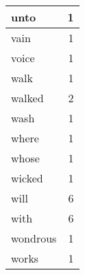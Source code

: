 \begin{center}
\begin{longtable}{l|r}
unto & 1 \\ \hline
vain & 1 \\ \hline
voice & 1 \\ \hline
walk & 1 \\ \hline
walked & 2 \\ \hline
wash & 1 \\ \hline
where & 1 \\ \hline
whose & 1 \\ \hline
wicked & 1 \\ \hline
will & 6 \\ \hline
with & 6 \\ \hline
wondrous & 1 \\ \hline
works & 1 \\ \hline
\end{longtable}
\end{center}



\normalsize



